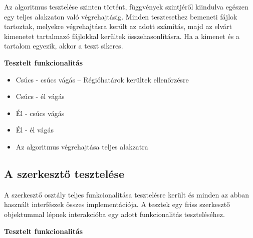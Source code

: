 Az algoritmus tesztelése szinten történt, függvények szintjéről kiindulva egészen egy teljes alakzaton való végrehajtásig. Minden tesztesethez bemeneti fájlok tartoztak, melyekre végrehajtásra került az adott számítás, majd az elvárt kimenetet tartalmazó fájlokkal kerültek összehasonlításra. Ha a kimenet és a tartalom egyezik, akkor a teszt sikeres.

\textbf{Tesztelt funkcionalitás}

\begin{itemize}
    \item Csúcs - csúcs vágás -- Régióhatárok kerültek ellenőrzésre
    \item Csúcs - él vágás
    \item Él - csúcs vágás
    \item Él - él vágás
    \item Az algoritmus végrehajtása teljes alakzatra
\end{itemize}


\subsection{A szerkesztő tesztelése}

A szerkesztő osztály teljes funkcionalitása tesztelésre került és minden az abban használt interfészek összes implementációja. A tesztek egy friss szerkesztő objektummal lépnek interakcióba egy adott funkcionalitás teszteléséhez.

\textbf{Tesztelt funkcionalitás}

